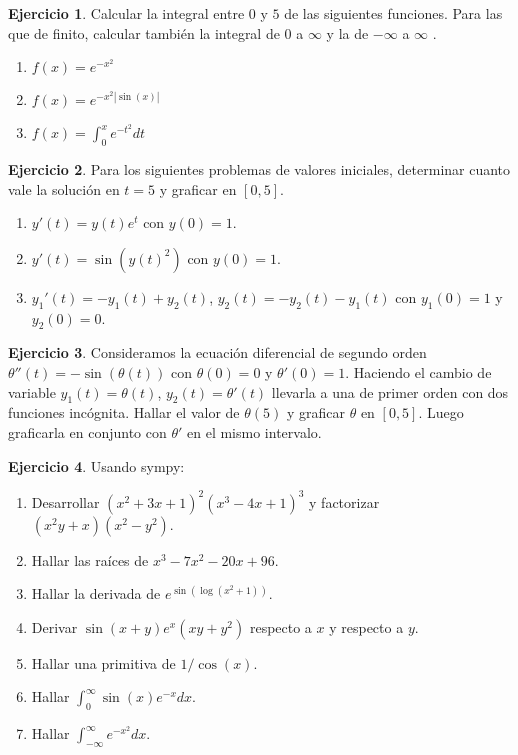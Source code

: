 \documentclass[a4paper,12pt]{book}
\theoremstyle{definition}
\newtheorem{ejercicio}{Ejercicio}
\begin{document}
	\begin{ejercicio}
		Calcular la integral entre $0$ y $5$ de las siguientes funciones. Para las que de finito, calcular también la integral de $0$ a $\infty$ y la de $-\infty$ a $\infty$ .
		\begin{enumerate}
			\item $f(x) = e^{-x^2}$
			\item $f(x) = e^{-x^2|\sin(x)|}$
			\item $f(x) = \int_0^xe^{-t^2}dt$
		\end{enumerate}
	\end{ejercicio}
	
	\begin{ejercicio}
		Para los siguientes problemas de valores iniciales, determinar cuanto vale la solución en $t=5$ y graficar en $[0,5]$.
		\begin{enumerate}
			\item $y'(t) = y(t)e^t$ con $y(0) = 1$.
			\item $y'(t) = \sin(y(t)^2)$ con $y(0) = 1$.
			\item $y_1'(t) = -y_1(t) + y_2(t)$, $y_2(t) = -y_2(t) - y_1(t)$ con $y_1(0) = 1$ y $y_2(0) = 0$.
		\end{enumerate}
	\end{ejercicio}
	\begin{ejercicio}
		Consideramos la ecuación diferencial de segundo orden $\theta''(t) = -\sin(\theta(t))$ con $\theta(0) = 0$ y $\theta'(0) = 1$. Haciendo el cambio de variable  $y_1(t) = \theta(t)$, $y_2(t) = \theta'(t)$ llevarla a una de primer orden con dos funciones incógnita. Hallar el valor de $\theta(5)$ y graficar $\theta$ en $[0,5]$. Luego graficarla en conjunto con $\theta'$ en el mismo intervalo.
	\end{ejercicio}
	\begin{ejercicio}
		Usando sympy:
		\begin{enumerate}
			\item Desarrollar $(x^2+3x+1)^2(x^3-4x+1)^3$ y factorizar $(x^2y + x)(x^2-y^2)$.
			\item Hallar las raíces de $x^3 - 7x^2-20x+96$.
			\item Hallar la derivada de $e^{\sin(\log(x^2+1))}$.
			\item Derivar $\sin(x+y)e^x(xy+y^2)$ respecto a $x$ y respecto a $y$.
			\item Hallar una primitiva de $1/\cos(x)$.
			\item Hallar $\int_0^\infty \sin(x)e^{-x}dx$.
			\item Hallar $\int_{-\infty}^\infty e^{-x^2}dx$.
		\end{enumerate} 
	\end{ejercicio}
	
\end{document}
